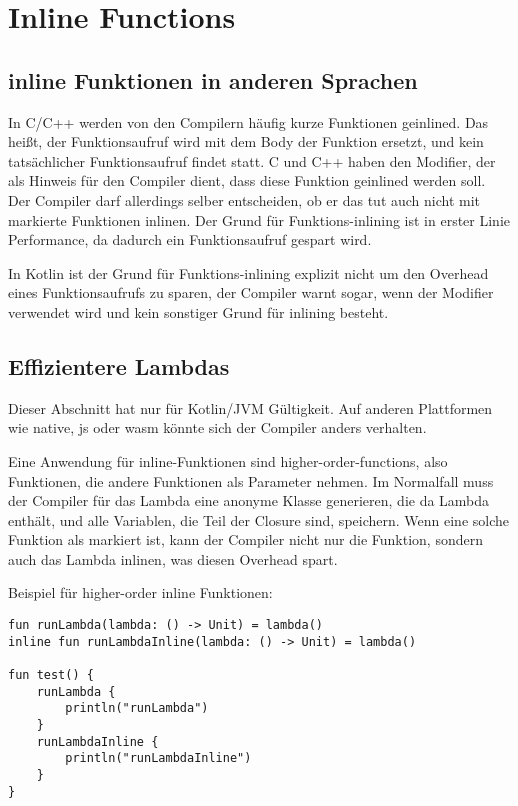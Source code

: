 
\section{Inline Functions}\label{sec:inline-functions}

\renewcommand{\kapitelautor}{Autor: Marvin Kurka}

\subsection{inline Funktionen in anderen Sprachen}
In C/C++ werden von den Compilern häufig kurze Funktionen geinlined.
Das heißt, der Funktionsaufruf wird mit dem Body der Funktion ersetzt, und kein tatsächlicher
Funktionsaufruf findet statt.
C und C++ haben den  Modifier, der als Hinweis für den Compiler dient, dass diese Funktion
geinlined werden soll.
Der Compiler darf allerdings selber entscheiden, ob er das tut \bzw auch nicht mit  markierte
Funktionen inlinen.
Der Grund für Funktions-inlining ist in erster Linie Performance, da dadurch ein Funktionsaufruf gespart wird.\cite{crefInline}

In Kotlin ist der Grund für Funktions-inlining explizit nicht um den Overhead eines Funktionsaufrufs zu sparen,
der Compiler warnt sogar, wenn der  Modifier verwendet wird und kein sonstiger Grund für
inlining besteht.\cite{kdocInline}

\subsection{Effizientere Lambdas}
Dieser Abschnitt hat nur für Kotlin/JVM Gültigkeit.
Auf anderen Plattformen wie native, js oder wasm könnte sich der Compiler anders verhalten.

Eine Anwendung für inline-Funktionen sind higher-order-functions, also Funktionen, die andere Funktionen als Parameter
nehmen.
Im Normalfall muss der Compiler für das Lambda eine anonyme Klasse generieren, die da Lambda enthält, und alle Variablen,
die Teil der Closure sind, speichern.
Wenn eine solche Funktion als  markiert ist, kann der Compiler nicht nur die Funktion, sondern auch
das Lambda inlinen, was diesen Overhead spart.\cite{kdocInline}

Beispiel für higher-order inline Funktionen:

\begin{verbatim}
fun runLambda(lambda: () -> Unit) = lambda()
inline fun runLambdaInline(lambda: () -> Unit) = lambda()

fun test() {
    runLambda {
        println("runLambda")
    }
    runLambdaInline {
        println("runLambdaInline")
    }
}
\end{verbatim}

